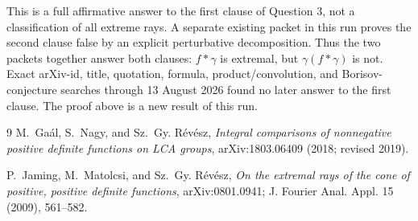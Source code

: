 \documentclass[10pt]{article}
\begin{document}
This is a full affirmative answer to the first clause of Question 3, not a
classification of all extreme rays.  A separate existing packet in this run
proves the second clause false by an explicit perturbative decomposition.
Thus the two packets together answer both clauses: \(f*\gamma\) is extremal,
but \(\gamma(f*\gamma)\) is not.  Exact arXiv-id, title, quotation, formula,
product/convolution, and Borisov-conjecture searches through 13 August 2026
found no later answer to the first clause.  The proof above is a new result
of this run.

\begin{thebibliography}{9}
M.~Ga\'al, S.~Nagy, and Sz.~Gy. R\'ev\'esz,
\emph{Integral comparisons of nonnegative positive definite functions on
LCA groups}, arXiv:1803.06409 (2018; revised 2019).

P.~Jaming, M.~Matolcsi, and Sz.~Gy. R\'ev\'esz,
\emph{On the extremal rays of the cone of positive, positive definite
functions}, arXiv:0801.0941; J. Fourier Anal. Appl. 15 (2009), 561--582.
\end{thebibliography}
\end{document}
